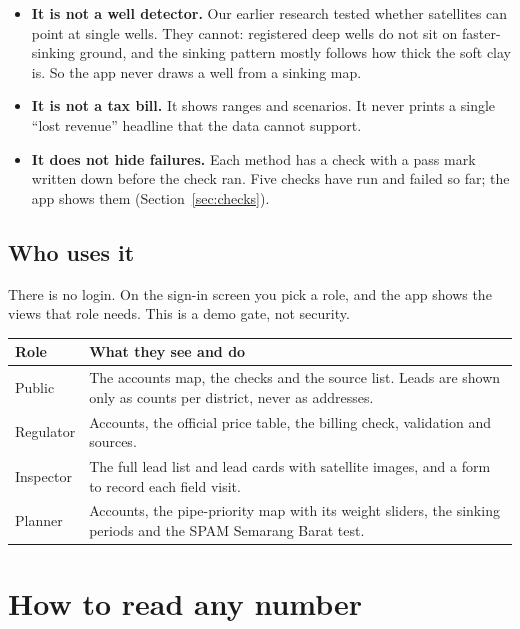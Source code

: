 \documentclass[11pt,a4paper]{article}
\begin{document}
\begin{itemize}
\item \textbf{It is not a well detector.} Our earlier research tested whether satellites can point at
  single wells. They cannot: registered deep wells do not sit on faster-sinking ground, and the sinking
  pattern mostly follows how thick the soft clay is. So the app never draws a well from a sinking map.
\item \textbf{It is not a tax bill.} It shows ranges and scenarios. It never prints a single
  ``lost revenue'' headline that the data cannot support.
\item \textbf{It does not hide failures.} Each method has a check with a pass mark written down before the
  check ran. Five checks have run and failed so far; the app shows them (Section~\ref{sec:checks}).
\end{itemize}

\subsection{Who uses it}

There is no login. On the sign-in screen you pick a role, and the app shows the views that role needs.
This is a demo gate, not security.

\begin{center}
\small
\begin{tabularx}{\linewidth}{@{}L{24mm}Y@{}}
\toprule
\textbf{Role} & \textbf{What they see and do}\\
\midrule
Public & The accounts map, the checks and the source list. Leads are shown only as counts per district,
  never as addresses.\\
Regulator & Accounts, the official price table, the billing check, validation and sources.\\
Inspector & The full lead list and lead cards with satellite images, and a form to record each field
  visit.\\
Planner & Accounts, the pipe-priority map with its weight sliders, the sinking periods and the SPAM
  Semarang Barat test.\\
\bottomrule
\end{tabularx}
\end{center}

\section{How to read any number}\label{sec:labels}
\end{document}
